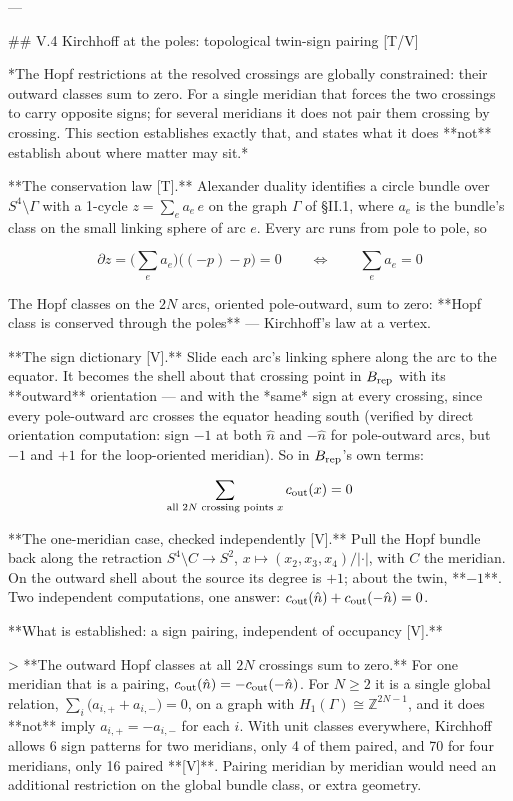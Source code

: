 ---

## V.4 Kirchhoff at the poles: topological twin-sign pairing [T/V]

*The Hopf restrictions at the resolved crossings are globally constrained: their outward classes sum to zero. For a single meridian that forces the two crossings to carry opposite signs; for several meridians it does not pair them crossing by crossing. This section establishes exactly that, and states what it does **not** establish about where matter may sit.*

**The conservation law [T].** Alexander duality identifies a circle bundle over $S^4\setminus\Gamma$ with a 1-cycle $z = \sum_e a_e\,e$ on the graph $\Gamma$ of §II.1, where $a_e$ is the bundle's class on the small linking sphere of arc $e$. Every arc runs from pole to pole, so

$$\partial z = \Big(\sum_e a_e\Big)\big((-p)-p\big) = 0\qquad\Longleftrightarrow\qquad\sum_e a_e = 0$$

The Hopf classes on the $2N$ arcs, oriented pole-outward, sum to zero: **Hopf class is conserved through the poles** — Kirchhoff's law at a vertex.

**The sign dictionary [V].** Slide each arc's linking sphere along the arc to the equator. It becomes the shell about that crossing point in $B_{\rm rep}$ with its **outward** orientation — and with the *same* sign at every crossing, since every pole-outward arc crosses the equator heading south (verified by direct orientation computation: sign $-1$ at both $\hat n$ and $-\hat n$ for pole-outward arcs, but $-1$ and $+1$ for the loop-oriented meridian). So in $B_{\rm rep}$'s own terms:

$$\sum_{\text{all }2N\text{ crossing points }x} c_{\rm out}(x) = 0$$

**The one-meridian case, checked independently [V].** Pull the Hopf bundle back along the retraction $S^4\setminus C\to S^2$, $x\mapsto(x_2,x_3,x_4)/|\cdot|$, with $C$ the meridian. On the outward shell about the source its degree is $+1$; about the twin, **$-1$**. Two independent computations, one answer: $c_{\rm out}(\hat n)+c_{\rm out}(-\hat n) = 0$.

**What is established: a sign pairing, independent of occupancy [V].**

> **The outward Hopf classes at all $2N$ crossings sum to zero.** For one meridian that is a pairing, $c_{\rm out}(\hat n) = -c_{\rm out}(-\hat n)$. For $N\geq2$ it is a single global relation, $\sum_i\big(a_{i,+}+a_{i,-}\big) = 0$, on a graph with $H_1(\Gamma)\cong\mathbb{Z}^{2N-1}$, and it does **not** imply $a_{i,+} = -a_{i,-}$ for each $i$. With unit classes everywhere, Kirchhoff allows 6 sign patterns for two meridians, only 4 of them paired, and 70 for four meridians, only 16 paired **[V]**. Pairing meridian by meridian would need an additional restriction on the global bundle class, or extra geometry.

